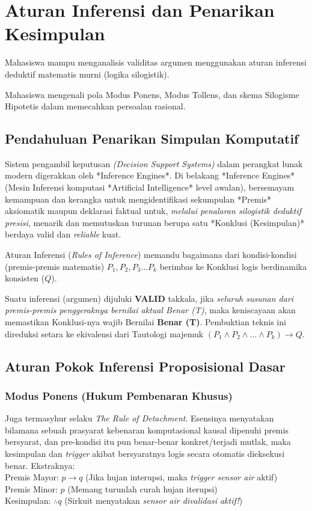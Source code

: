 \documentclass[../main.tex]{subfiles}
\begin{document}
\chapter{Aturan Inferensi dan Penarikan Kesimpulan}

\begin{subcpmk}
  \item Mahasiswa mampu menganalisis validitas argumen menggunakan aturan inferensi deduktif matematis murni (logika silogistik).
  \item Mahasiswa mengenali pola Modus Ponens, Modus Tollens, dan skema Silogisme Hipotetis dalam memecahkan persoalan rasional.
\end{subcpmk}

\section{Pendahuluan Penarikan Simpulan Komputatif}

Sistem pengambil keputusan \textit{(Decision Support Systems)} dalam perangkat lunak modern digerakkan oleh *Inference Engines*. Di belakang *Inference Engines* (Mesin Inferensi komputasi *Artificial Intelligence* level awalan), bersemayam kemampuan dan kerangka untuk mengidentifikasi sekumpulan *Premis* aksiomatik maupun deklarasi faktual untuk, \textit{melalui penalaran silogistik deduktif presisi}, menarik dan memutuskan turunan berupa satu *Konklusi (Kesimpulan)* berdaya valid dan \textit{reliable} kuat.

Aturan Inferensi (\textit{Rules of Inference}) memandu bagaimana dari kondisi-kondisi (premis-premis matematis) $P_1, P_2, P_3 \dots P_k$ berimbas ke Konklusi logis berdinamika konsisten ($Q$).

Suatu inferensi (argumen) dijuluki \textbf{VALID} takkala, jika \textit{seluruh susunan dari premis-premis penggeraknya bernilai aktual Benar (T)}, maka keniscayaan akan memastikan Konklusi-nya wajib Bernilai \textbf{Benar (T)}. Pembuktian teknis ini direduksi setara ke ekivalensi dari Tautologi majemuk $(P_1 \land P_2 \land \dots \land P_k) \rightarrow Q$.

\section{Aturan Pokok Inferensi Proposisional Dasar}

\subsection{Modus Ponens (Hukum Pembenaran Khusus)}
Juga termasyhur selaku \textit{The Rule of Detachment}. Esensinya menyatakan bilamana sebuah prasyarat kebenaran komputasional kausal dipenuhi premis bersyarat, dan pre-kondisi itu pun benar-benar konkret/terjadi mutlak, maka kesimpulan dan \textit{trigger} akibat bersyaratnya logis secara otomatis dieksekusi benar. Ekstraknya:\\
Premis Mayor: $p \rightarrow q$ (Jika hujan interupsi, maka \textit{trigger sensor air} aktif) \\
Premis Minor: $p$ (Memang turunlah curah hujan iterupsi) \\
Kesimpulan: $\therefore q$ (Sirkuit menyatakan \textit{sensor air divalidasi aktif!})
\end{document}
